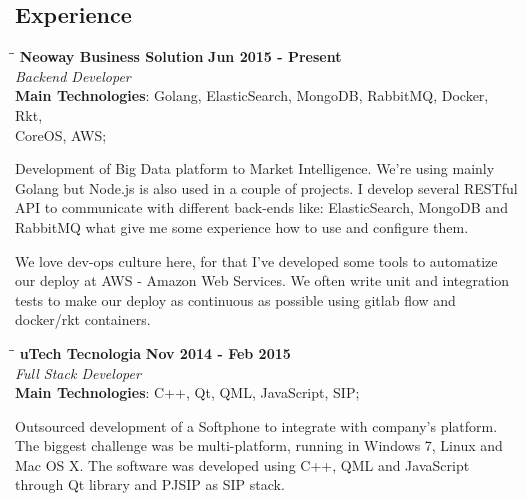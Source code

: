 \documentclass[margin]{res}
\begin{document}
\begin{resume}
\section{Experience}
\vspace{-0.1in}
    \begin{tabbing}
    \hspace{2.3in}\= \hspace{1.7in}\= \kill %
    \textbf{Neoway Business Solution}    \>\>\textbf{Jun 2015 - Present}\\
    \textit{Backend Developer}\\
    \textbf{Main Technologies}: Golang, ElasticSearch, MongoDB, RabbitMQ, Docker, Rkt,\\CoreOS, AWS;
    \end{tabbing}\vspace{-20pt}      %
    \vspace{2mm}
Development of Big Data platform to Market Intelligence. We're using mainly Golang but Node.js is also used in a couple of projects. I develop several RESTful API to communicate with different back-ends like: ElasticSearch, MongoDB and RabbitMQ what give me some experience how to use and configure them. 

We love dev-ops culture here, for that I've developed some tools to automatize our deploy at AWS - Amazon Web Services. We often write unit and integration tests to make our deploy as continuous as possible using gitlab flow and docker/rkt containers.

\vspace{-0.1in}
    \begin{tabbing}
    \hspace{2.3in}\= \hspace{1.7in}\= \kill
    \textbf{uTech Tecnologia}    \>\>\textbf{Nov 2014 - Feb 2015}\\
    \textit{Full Stack Developer}\\
    \textbf{Main Technologies}: C++, Qt, QML, JavaScript, SIP;
    \end{tabbing}\vspace{-20pt}
    \vspace{2mm}
Outsourced development of a Softphone to integrate with company’s platform. The biggest challenge was be multi-platform, running in Windows 7, Linux and Mac OS X. The software was developed using C++, QML and JavaScript through Qt library and PJSIP as SIP stack.    


\end{resume}
\end{document}
